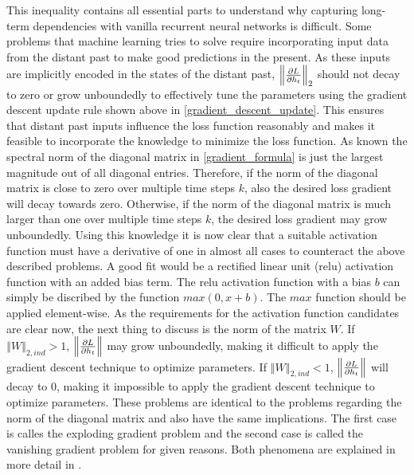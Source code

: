 \documentclass[draft,final]{vutinfth} %
\begin{document}
    This inequality contains all essential parts to understand why capturing long-term dependencies with vanilla recurrent neural networks is difficult.
    Some problems that machine learning tries to solve require incorporating input data from the distant past to make good predictions in the present.
    As these inputs are implicitly encoded in the states of the distant past, $\left\Vert \pdv{L}{h_t} \right\Vert_2$ should not decay to zero or grow unboundedly to effectively tune the parameters using the gradient descent update rule shown above in \ref{gradient_descent_update}.
    This ensures that distant past inputs influence the loss function reasonably and makes it feasible to incorporate the knowledge to minimize the loss function.
    As known the spectral norm of the diagonal matrix in \ref{gradient_formula} is just the largest magnitude out of all diagonal entries.
    Therefore, if the norm of the diagonal matrix is close to zero over multiple time steps $k$, also the desired loss gradient will decay towards zero.
    Otherwise, if the norm of the diagonal matrix is much larger than one over multiple time steps $k$, the desired loss gradient may grow unboundedly.
    Using this knowledge it is now clear that a suitable activation function must have a derivative of one in almost all cases to counteract the above described problems.
    A good fit would be a rectified linear unit (relu) activation function with an added bias term.
    The relu activation function with a bias $b$ can simply be discribed by the function $max(0,x+b)$. The $max$ function should be applied element-wise.
    As the requirements for the activation function candidates are clear now, the next thing to discuss is the norm of the matrix $W$.
    If $\left\Vert W \right\Vert_{2,ind} > 1$, $\left\Vert \pdv{L}{h_t} \right\Vert$ may grow unboundedly, making it difficult to apply the gradient descent technique to optimize parameters.
    If $\left\Vert W \right\Vert_{2,ind} < 1$, $\left\Vert \pdv{L}{h_t} \right\Vert$ will decay to $0$, making it impossible to apply the gradient descent technique to optimize parameters.
    These problems are identical to the problems regarding the norm of the diagonal matrix and also have the same implications.
    The first case is calles the exploding gradient problem and the second case is called the vanishing gradient problem for given reasons.
    Both phenomena are explained in more detail in \cite{LongTermDependenciesGradientDescent}.
\end{document}
